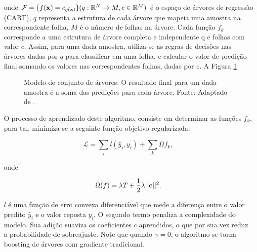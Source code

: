 onde $\mathcal{F}=\{f({\bf x})=c_{q({\bf x})}\}(q:\mathbb{R}^N\to{M},c\in\mathbb{R}^{M})$ é o espaço de árvores de regressão (CART), $q$ representa a estrutura de cada árvore que mapeia uma amostra na correspondente folha, $M$ é o número de folhas na árvore. Cada função $f_k$ corresponde a uma estrutura de árvore completa e independente q e folhas com valor $c$. Assim, para uma dada amostra, utiliza-se as regras de decisões nas árvores dadas por $q$ para classificar em uma folha, e calcular o valor de predição final somando os valores nas correspondentes folhas, dadas por c. A Figura \ref{fig:tree_model}

\begin{figure}[H]
\centering
{}
\caption{Modelo de conjunto de árvores. O resultado final para um dada amostra é a soma das predições para cada árvore. Fonte: Adaptado de \cite{CHEN:2016}.}
\label{fig:tree_model}
\end{figure}

O processo de aprendizado deste algoritmo, consiste em determinar as funções $f_k$, para tal, minimiza-se a seguinte função objetivo regularizada:

\begin{equation}\label{eq:xgboostmin}
\mathcal{L}=\sum_{i}l(\hat{y}_i, y_i)+\sum_{k}\Omega{f_k}\mbox{,}~
\end{equation}

\noindent
onde 

\begin{equation}
\Omega(f)=\lambda{T}+\frac{1}{2}\lambda||{\bf c}||^2\mbox{.}
\end{equation}

$l$ é uma função de erro convexa diferenciável que mede a diferença entre o valor predito $\hat{y}_i$ e o valor reposta $y_i$. O segundo termo penaliza a complexidade do modelo. Sua adição suaviza os coeficientes $c$ aprendidos, o que por sua vez reduz a probabilidade de sobreajuste. Note que quando $\gamma=0$, o algoritmo se torna boosting de árvores com gradiente tradicional.

